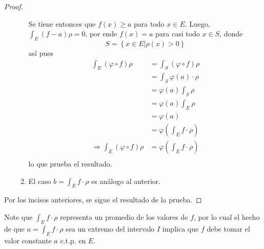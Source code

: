 \documentclass[12pt]{report}
\theoremstyle{largebreak}
\begin{document}
\begin{proof}
\begin{enumerate}
\begin{enumerate}
                Se tiene entonces que $f(x)\geq a$ para todo $x\in E$. Luego, $\int_E(f-a)\rho=0$, por ende $f(x)=a$ para casi todo $x\in S$, donde
                \begin{equation*}
                    S=\left\{x\in E\Big|\rho(x)>0 \right\}
                \end{equation*}
                así pues
                \begin{equation*}
                    \begin{split}
                        \int_E(\varphi\circ f)\rho&=\int_S(\varphi\circ f)\rho\\
                        &=\int_S\varphi(a)\cdot\rho\\
                        &=\varphi(a)\int_S\rho\\
                        &=\varphi(a)\int_E\rho\\
                        &=\varphi(a)\\
                        &=\varphi\left(\int_Ef\cdot\rho\right)\\
                        \Rightarrow \int_E(\varphi\circ f)\rho&=\varphi\left(\int_Ef\cdot\rho\right)\\
                    \end{split}
                \end{equation*}
                lo que prueba el resultado.

                \item El caso $b=\int_Ef\cdot\rho$ es análogo al anterior.
            \end{enumerate}
        \end{enumerate}
        Por los incisos anteriores, se sigue el resultado de la prueba.
    \end{proof}

    \begin{obs}
        Note que $\int_Ef\cdot\rho$ representa un promedio de los valores de $f$, por lo cual el hecho de que $a=\int_Ef\cdot\rho$ sea un extremo del intervalo $I$ implica que $f$ debe tomar el valor constante $a$ c.t.p. en $E$.
    \end{obs}
\end{document}
